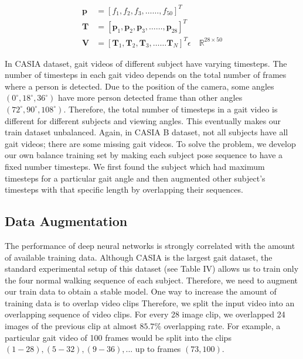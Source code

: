 \begin{equation}
\begin{split}
\boldsymbol{p} &= {[f_1, f_2, f_3, \ldots \ldots, f_{50}]}^T \\
\boldsymbol {T} &= {[\boldsymbol p_1, \boldsymbol p_2, \boldsymbol p_3,  \ldots \ldots, \boldsymbol p_{28}]}^T \\
\boldsymbol V &= {[\boldsymbol T_1, \boldsymbol T_2, \boldsymbol T_3,  \ldots \ldots \boldsymbol T_{N}]}^T \epsilon \quad \mathbb {R}^{28\times 50}
\end{split}
\end{equation}

In CASIA dataset, gait videos of different subject have varying timesteps. The number of timesteps in each gait video depends on the total number of frames where a person is detected. Due to the position of the camera, some angles ${(0^{\circ}, 18^{\circ}, 36^{\circ})}$ have more person detected frame than other angles ${(72^{\circ}, 90^{\circ}, 108^{\circ})}$. Therefore, the total number of timesteps in a gait video is different for different subjects and viewing angles. This eventually makes our train dataset unbalanced. Again, in CASIA B dataset, not all subjects have all gait videos; there are some missing gait videos. To solve the problem, we develop our own balance training set by making each subject pose sequence to have a fixed number timesteps. We first found the subject which had maximum timesteps for a particular gait angle and then augmented other subject's timesteps with that specific length by overlapping their sequences.


\subsection{Data Augmentation}
The performance of deep neural networks is strongly correlated with the amount of available training data.  Although CASIA is the largest gait dataset, the standard experimental setup of this dataset (see Table IV) allows us to train only the four normal walking sequence of each subject. Therefore, we need to augment our train data to obtain a stable model.  
One way to increase the amount of training data is to overlap video clips Therefore, we split the input video into an overlapping sequence of video clips. For every 28 image clip, we overlapped 24 images of the previous clip at almost $ 85.7\% $ overlapping rate. For example, a particular gait video of 100 frames would be split into the clips $(1-28), (5-32), (9-36), ...$ up to frames $(73, 100)$. 

